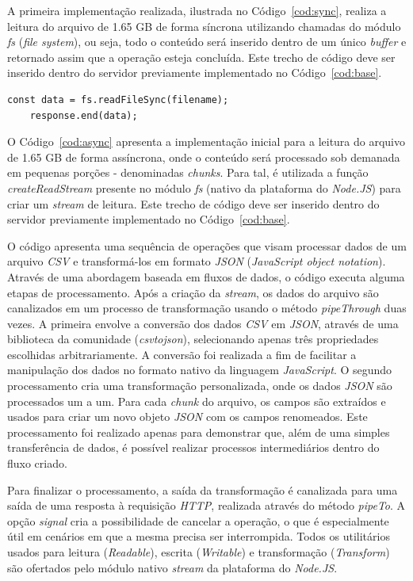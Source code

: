 \documentclass[12pt]{article}
\begin{document}
A primeira implementação realizada, ilustrada no Código~\ref{cod:sync}, realiza a leitura do arquivo de 1.65 GB
de forma síncrona utilizando chamadas do módulo \textit{fs} (\textit{file system}), ou seja, todo o conteúdo será
inserido dentro de um único \textit{buffer} e retornado assim que a operação esteja concluída. Este trecho de código
deve ser inserido dentro do servidor previamente implementado no Código~\ref{cod:base}.

\begin{lstlisting}[caption={Implementação da leitura do arquivo de forma síncrona}, label=cod:sync]
	const data = fs.readFileSync(filename);
	response.end(data);
\end{lstlisting}

O Código~\ref{cod:async} apresenta a implementação inicial para a leitura do arquivo de 1.65 GB de forma assíncrona,
onde o conteúdo será processado sob demanada em pequenas porções - denominadas \textit{chunks}. Para tal, é utilizada
a função \textit{createReadStream} presente no módulo \textit{fs} (nativo da plataforma do \textit{Node.JS}) para
criar um \textit{stream} de leitura. Este trecho de código deve ser inserido dentro do servidor previamente 
implementado no Código~\ref{cod:base}.

O código apresenta uma sequência de operações que visam processar dados de um arquivo \textit{CSV} e 
transformá-los em formato \textit{JSON} (\textit{JavaScript object notation}). Através de uma abordagem baseada 
em fluxos de dados, o código executa alguma etapas de processamento. Após a criação da \textit{stream}, 
os dados do arquivo são canalizados em um processo de 
transformação usando o método \textit{pipeThrough} duas vezes. A primeira envolve a 
conversão dos dados \textit{CSV} em \textit{JSON}, através de uma biblioteca da comunidade (\textit{csvtojson}), 
selecionando apenas três propriedades escolhidas arbitrariamente. A conversão foi realizada a fim de facilitar
a manipulação dos dados no formato nativo da linguagem \textit{JavaScript}. O segundo processamento cria uma 
transformação personalizada, onde os dados \textit{JSON} são processados um a um. 
Para cada \textit{chunk} do arquivo, os campos são extraídos e usados para criar um novo objeto 
\textit{JSON} com os campos renomeados. Este processamento foi realizado apenas para demonstrar que, além de uma simples
transferência de dados, é possível realizar processos intermediários dentro do fluxo criado.

Para finalizar o processamento, a saída da transformação é canalizada para uma saída de uma resposta à requisição
\textit{HTTP}, realizada através do método \textit{pipeTo}. A opção \textit{signal} cria a possibilidade de 
cancelar a operação, o que é especialmente útil em cenários em que a mesma precisa ser interrompida. Todos os utilitários
usados para leitura (\textit{Readable}), escrita (\textit{Writable}) e transformação (\textit{Transform}) são ofertados
pelo módulo nativo \textit{stream} da plataforma do \textit{Node.JS}.
\end{document}
